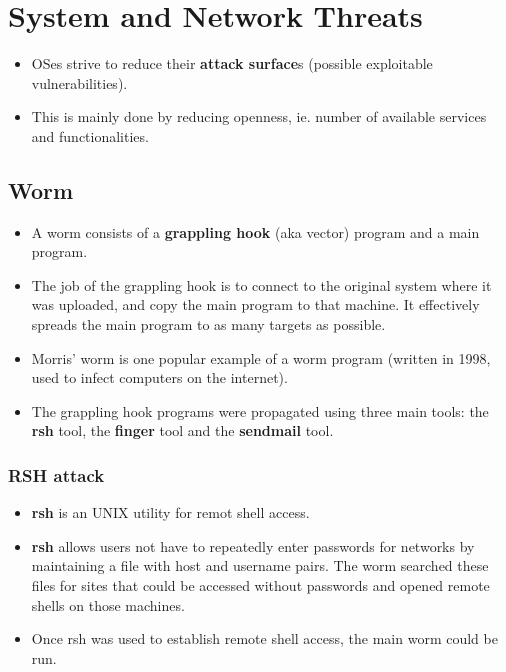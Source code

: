 \documentclass{article}
\theoremstyle{plain}
\theoremstyle{definition}
\begin{document}
\section{System and Network Threats}
\begin{itemize}
    \item OSes strive to reduce their \textbf{attack surface}s (possible exploitable vulnerabilities).
    
    \item This is mainly done by reducing openness, ie. number of available services and functionalities. 
\end{itemize}

\subsection{Worm}
\begin{itemize}
    \item A worm consists of a \textbf{grappling hook} (aka vector) program and a main program. 
    
    \item The job of the grappling hook is to connect to the original system where it was uploaded, and copy the main program to that machine. It effectively spreads the main program to as many targets as possible. 
    
    \item Morris' worm is one popular example of a worm program (written in 1998, used to infect computers on the internet). 
    
    \item The grappling hook programs were propagated using three main tools: the \textbf{rsh} tool, the \textbf{finger} tool and the \textbf{sendmail} tool.
    
\end{itemize}

\subsubsection{RSH attack}
\begin{itemize}
    \item \textbf{rsh} is an UNIX utility for remot shell access. 
    
    \item \textbf{rsh} allows users not have to repeatedly enter passwords for networks by maintaining a file with host and username pairs. The worm searched these files for sites that could be accessed without passwords and opened remote shells on those machines. 
    
    \item Once rsh was used to establish remote shell access, the main worm could be run. 

\end{itemize}
\end{document}
